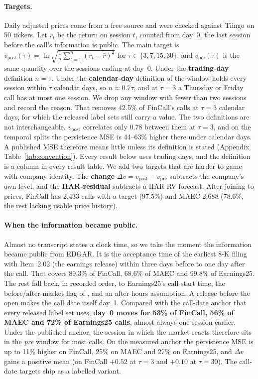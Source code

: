 \paragraph{Targets.}
Daily adjusted prices come from a free source and were checked against Tiingo on
50 tickers. Let $r_t$ be the return on session $t$, counted from day~0, the last
session before the call's information is public. The main target is
$v_{\mathrm{post}}(\tau)=\ln\sqrt{\frac{1}{n}\sum_{t=1}^{n}(r_t-\bar r)^2}$ for
$\tau\in\{3,7,15,30\}$, and $v_{\mathrm{pre}}(\tau)$ is the same quantity over the
sessions ending at day~0. Under the \textbf{trading-day} definition $n=\tau$. Under
the \textbf{calendar-day} definition of \citet{qin2019what} the window holds every
session within $\tau$ calendar days, so $n\approx0.7\tau$, and at $\tau{=}3$ a
Thursday or Friday call has at most one session. We drop any window with fewer
than two sessions and record the reason. That removes 42.5\% of FinCall's calls at
$\tau{=}3$ calendar days, for which the released label sets still carry a value.
The two definitions are not interchangeable. $v_{\mathrm{post}}$ correlates only
0.78 between them at $\tau{=}3$, and on the temporal splits the persistence MSE is
44--63\% higher there under calendar days. A published MSE therefore means little
unless its definition is stated (Appendix Table~\ref{tab:convention}). Every result below uses trading
days, and the definition is a column in every result table. We add two targets
that are harder to game with company identity. The \textbf{change}
$\Delta v=v_{\mathrm{post}}-v_{\mathrm{pre}}$ subtracts the company's own level,
and the \textbf{HAR-residual} subtracts a HAR-RV forecast. After joining to
prices, FinCall has 2{,}433 calls with a target (97.5\%) and MAEC 2{,}688 (78.6\%,
the rest lacking usable price history).

\paragraph{When the information became public.}
\label{sec:timing}
Almost no transcript states a clock time, so we take the moment the information
became public from EDGAR. It is the acceptance time of the earliest 8-K filing
with Item~2.02 (the earnings release) within three days before to one day after
the call. That covers 89.3\% of FinCall, 68.6\% of MAEC and 99.8\% of Earnings25. The
rest fall back, in recorded order, to Earnings25's call-start time, the
before/after-market flag of \citet{scss2024}, and an after-hours assumption. A
release before the open makes the call date itself day~1. Compared with the
call-date anchor that every released label set uses, \textbf{day~0 moves for 53\%
of FinCall, 56\% of MAEC and 72\% of Earnings25 calls}, almost always one session
earlier. Under the published anchor, the session in which the market reacts
therefore sits in the \emph{pre} window for most calls. On the measured anchor the
persistence MSE is up to 11\% higher on FinCall, 25\% on MAEC and 27\% on
Earnings25, and $\Delta v$ gains a positive mean (on FinCall $+0.52$ at $\tau{=}3$
and $+0.10$ at $\tau{=}30$). The call-date targets ship as a labelled variant.

